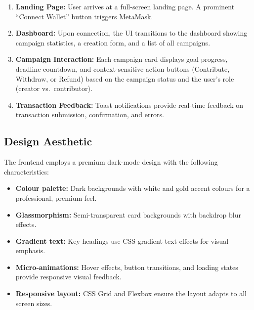 \begin{enumerate}[leftmargin=1.5em]
    \item \textbf{Landing Page:} User arrives at a full-screen landing page. A prominent ``Connect Wallet'' button triggers MetaMask.
    \item \textbf{Dashboard:} Upon connection, the UI transitions to the dashboard showing campaign statistics, a creation form, and a list of all campaigns.
    \item \textbf{Campaign Interaction:} Each campaign card displays goal progress, deadline countdown, and context-sensitive action buttons (Contribute, Withdraw, or Refund) based on the campaign status and the user's role (creator vs.\ contributor).
    \item \textbf{Transaction Feedback:} Toast notifications provide real-time feedback on transaction submission, confirmation, and errors.
\end{enumerate}

\subsection{Design Aesthetic}

The frontend employs a premium dark-mode design with the following characteristics:
\begin{itemize}[leftmargin=1.5em]
    \item \textbf{Colour palette:} Dark backgrounds with white and gold accent colours for a professional, premium feel.
    \item \textbf{Glassmorphism:} Semi-transparent card backgrounds with backdrop blur effects.
    \item \textbf{Gradient text:} Key headings use CSS gradient text effects for visual emphasis.
    \item \textbf{Micro-animations:} Hover effects, button transitions, and loading states provide responsive visual feedback.
    \item \textbf{Responsive layout:} CSS Grid and Flexbox ensure the layout adapts to all screen sizes.
\end{itemize}
